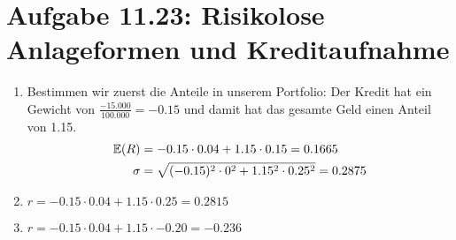 \documentclass{article}
\newcommand{\E}{\mathbb{E}}
\begin{document}
		\section*{Aufgabe 11.23: Risikolose Anlageformen und Kreditaufnahme}
	\begin{enumerate}[label=(\alph*)]
		\item Bestimmen wir zuerst die Anteile in unserem Portfolio: Der Kredit hat ein Gewicht von $\frac{-15.000}{100.000} = -0.15$ und damit hat das gesamte Geld einen Anteil von 1.15.
		\begin{align}
			\E(R) &= -0.15\cdot 0.04 + 1.15\cdot 0.15 = 0.1665 \notag \\
			\sigma &= \sqrt{(-0.15)^2\cdot 0^2 + 1.15^2\cdot 0.25^2} = 0.2875 \notag
		\end{align}
		\item $r = -0.15\cdot 0.04 + 1.15\cdot 0.25 = 0.2815$
		\item $r = -0.15\cdot 0.04 + 1.15\cdot -0.20 = -0.236$
	\end{enumerate}	
	
\end{document}
